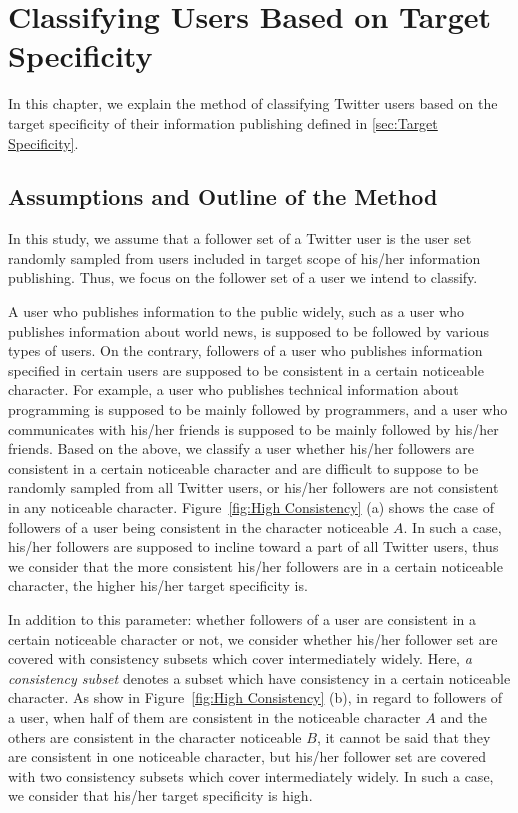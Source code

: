 \section{Classifying Users Based on Target Specificity}
\label{sec:ClassificationMethod1}

In this chapter, we explain the method of classifying Twitter users
based on the target specificity of their information publishing defined
in \ref{sec:Target Specificity}.

\subsection{Assumptions and Outline of the Method}
\label{subsec:Assumptions}

In this study, we assume that a follower set of a Twitter user is the
user set randomly sampled from users included in target scope of his/her
information publishing.  Thus, we focus on the follower set of a user we
intend to classify.

A user who publishes information to the public widely, such as a user
who publishes information about world news, is supposed to be followed
by various types of users.  On the contrary, followers of a user who
publishes information specified in certain users are supposed to be
consistent in a certain noticeable character.  For example, a user who
publishes technical information about programming is supposed to be
mainly followed by programmers, and a user who communicates with his/her
friends is supposed to be mainly followed by his/her friends.  Based on
the above, we classify a user whether his/her followers are consistent
in a certain noticeable character and are difficult to suppose to be
randomly sampled from all Twitter users, or his/her followers are not
consistent in any noticeable character.  Figure~\ref{fig:High
Consistency} (a) shows the case of followers of a user being consistent
in the character noticeable $A$.  In such a case, his/her followers are
supposed to incline toward a part of all Twitter users, thus we consider
that the more consistent his/her followers are in a certain noticeable
character, the higher his/her target specificity is.

In addition to this parameter: whether followers of a user are
consistent in a certain noticeable character or not, we consider
whether his/her follower set are covered with consistency subsets which
cover intermediately widely.  Here, \emph{a consistency subset} denotes
a subset which have consistency in a certain noticeable character.  As
show in Figure~\ref{fig:High Consistency} (b), in regard to followers of
a user, when half of them are consistent in the noticeable character $A$
and the others are consistent in the character noticeable $B$, it cannot
be said that they are consistent in one noticeable character, but
his/her follower set are covered with two consistency subsets which
cover intermediately widely.  In such a case, we consider that his/her
target specificity is high.

